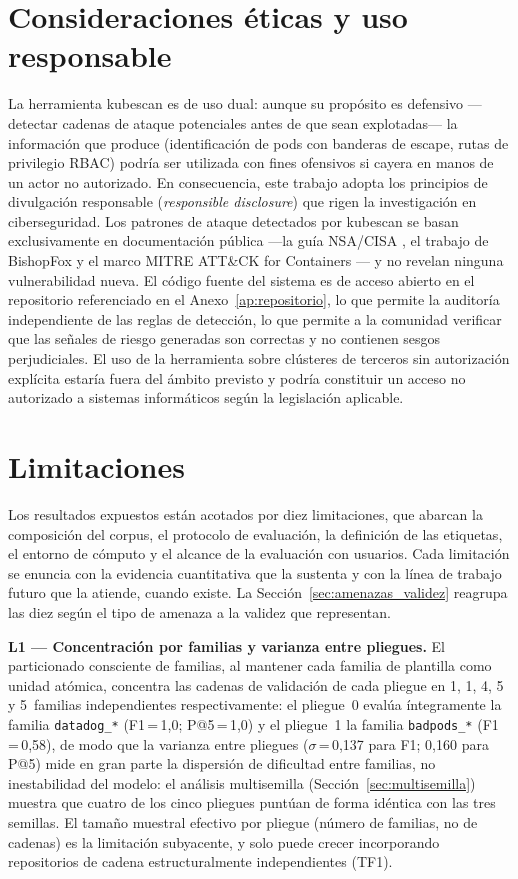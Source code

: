 \section{Consideraciones éticas y uso responsable}
\label{sec:etica}

La herramienta kubescan es de uso dual: aunque su propósito es defensivo
—detectar cadenas de ataque potenciales antes de que sean explotadas— la información
que produce (identificación de pods con banderas de escape, rutas de privilegio \ac{RBAC})
podría ser utilizada con fines ofensivos si cayera en manos de un actor no autorizado.
En consecuencia, este trabajo adopta los principios de divulgación responsable
(\textit{responsible disclosure}) que rigen la investigación en ciberseguridad.
Los patrones de ataque detectados por kubescan se basan exclusivamente en
documentación pública —la guía \ac{NSA}/\ac{CISA} \citep{NSA2022}, el trabajo de BishopFox
\citep{BishopFox2021} y el marco MITRE ATT\&CK for Containers \citep{MITRE2021Containers}—
y no revelan ninguna vulnerabilidad nueva. El código fuente del sistema es de acceso
abierto en el repositorio referenciado en el Anexo~\ref{ap:repositorio}, lo que
permite la auditoría independiente de las reglas de detección, lo que
permite a la comunidad verificar que las señales de riesgo generadas son correctas y
no contienen sesgos perjudiciales. El uso de la herramienta sobre clústeres de terceros
sin autorización explícita estaría fuera del ámbito previsto y podría constituir un
acceso no autorizado a sistemas informáticos según la legislación aplicable.

\section{Limitaciones}
\label{sec:limitaciones}

Los resultados expuestos están acotados por diez limitaciones, que abarcan la
composición del corpus, el protocolo de evaluación, la definición de las etiquetas,
el entorno de cómputo y el alcance de la evaluación con usuarios. Cada limitación se
enuncia con la evidencia cuantitativa que la sustenta y con la línea de trabajo
futuro que la atiende, cuando existe. La Sección~\ref{sec:amenazas_validez} reagrupa
las diez según el tipo de amenaza a la validez que representan.

\textbf{L1 — Concentración por familias y varianza entre pliegues.} El
particionado consciente de familias, al mantener cada familia de plantilla como
unidad atómica, concentra las cadenas de validación de cada pliegue en 1, 1, 4,
5 y 5~familias independientes respectivamente: el pliegue~0 evalúa íntegramente la familia
\texttt{datadog\_*} (F1\,=\,1,0; P@5\,=\,1,0) y el pliegue~1 la familia
\texttt{badpods\_*} (F1\,=\,0,58), de modo que la varianza entre pliegues
(\(\sigma\)\,=\,0,137 para F1; 0,160 para P@5) mide en gran parte la dispersión
de dificultad entre familias, no inestabilidad del modelo: el análisis
multisemilla (Sección~\ref{sec:multisemilla}) muestra que cuatro de los cinco
pliegues puntúan de forma idéntica con las tres semillas. El tamaño muestral
efectivo por pliegue (número de familias, no de cadenas) es la limitación
subyacente, y solo puede crecer incorporando repositorios de cadena
estructuralmente independientes (TF1).

